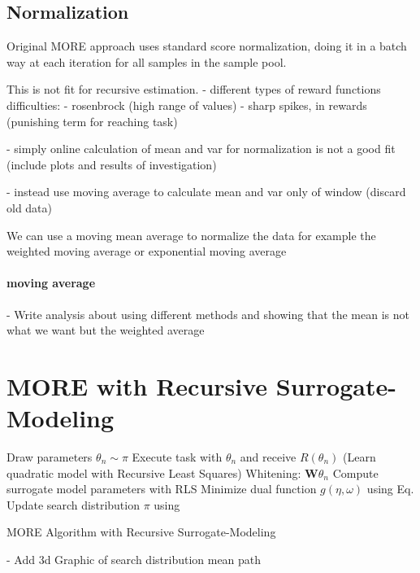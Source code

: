 \subsection{Normalization}
Original MORE approach uses standard score normalization, doing it
in a batch way at each iteration for all samples in the sample pool.

This is not fit for recursive estimation.
- different types of reward functions difficulties:
- rosenbrock (high range of values)
- sharp spikes, in rewards (punishing term for reaching task)

- simply online calculation of mean and var for normalization is not
a good fit (include plots and results of investigation)

- instead use moving average to calculate mean and var only of window (discard old
  data) 

We can use a moving mean average to normalize the data for example
the weighted moving average or exponential moving average

\paragraph{moving average}
- Write analysis about using different methods and showing that the mean
is not what we want but the weighted average


\section{MORE with Recursive Surrogate-Modeling}
\begin{algorithm}[H]
\DontPrintSemicolon
\SetAlgoLined
{}

{
  {
    Draw parameters $\theta_n \sim \pi$\;
    Execute task with $\theta_n$ and receive $R(\theta_n)$\;
  }
  \Begin(Learn quadratic model with Recursive Least Squares)
  {
    {
      Whitening: $\mathbf{W}\theta_n$\;
      Compute surrogate model parameters with RLS
    }
  }
  Minimize dual function $g(\eta, \omega)$ using Eq.\;
  Update search distribution $\pi$ using  \;
}
\caption{MORE Algorithm with Recursive Surrogate-Modeling}
\end{algorithm}

- Add 3d Graphic of search distribution mean path

